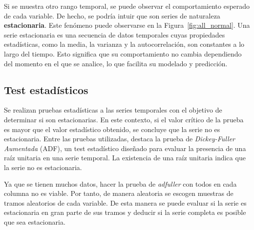 \documentclass[12pt,letterpaper]{article}
\begin{document}
Si se muestra otro rango temporal, se puede observar el comportamiento esperado de cada variable. De hecho, se podría intuir que son series de naturaleza \textbf{estacionaria}. Este fenómeno puede observarse en la Figura~\ref{fig:all_normal}.
Una serie estacionaria es una secuencia de datos temporales cuyas propiedades estadísticas, como la media, la varianza y la autocorrelación, son constantes a lo largo del tiempo. Esto significa que su comportamiento no cambia dependiendo del momento en el que se analice, lo que facilita su modelado y predicción.

\subsection{Test estadísticos}
Se realizan pruebas estadísticas a las series temporales con el objetivo de determinar si son estacionarias. En este contexto, si el valor crítico de la prueba es mayor que el valor estadístico obtenido, se concluye que la serie no es estacionaria.
Entre las pruebas utilizadas, destaca la prueba de \textit{Dickey-Fuller Aumentada} (ADF), un test estadístico diseñado para evaluar la presencia de una raíz unitaria en una serie temporal. La existencia de una raíz unitaria indica que la serie no es estacionaria.

Ya que se tienen muchos datos, hacer la prueba de \textit{adfuller} con todos en cada columna no es viable. Por tanto, de manera aleatoria se escogen muestras de tramos aleatorios de cada variable. De esta manera se puede evaluar si la serie es estacionaria en gran parte de sus tramos y deducir si la serie completa es posible que sea estacionaria.
\end{document}
